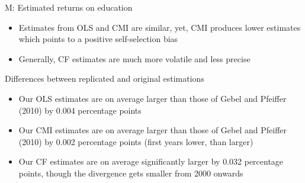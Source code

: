 \documentclass[10pt,ignorenonframetext,]{beamer}
\providecommand{\tightlist}{%
  \setlength{\itemsep}{0pt}\setlength{\parskip}{0pt}}
\begin{document}
\begin{frame}{M: Estimated returns on education}
\protect\hypertarget{m-estimated-returns-on-education}{}

\begin{itemize}
\tightlist
\item
  Estimates from OLS and CMI are similar, yet, CMI produces lower
  estimates which points to a positive self-selection bias
\item
  Generally, CF estimates are much more volatile and less precise
\end{itemize}

Differences between replicated and original estimations

\begin{itemize}
\tightlist
\item
  Our OLS estimates are on average larger than those of Gebel and
  Pfeiffer (2010) by 0.004 percentage points
\item
  Our CMI estimates are on average larger than those of Gebel and
  Pfeiffer (2010) by 0.002 percentage points (first years lower, than
  larger)
\item
  Our CF estimates are on average significantly larger by 0.032
  percentage points, though the divergence gets smaller from 2000
  onwards
\end{itemize}

\end{frame}
\end{document}
